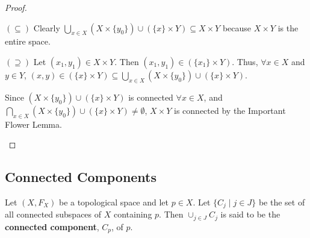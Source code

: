 \begin{proof}
\begin{itemize}
		$(\subseteq)$ Clearly $\displaystyle{\bigcup_{x \in X}(X\times \{y_0\}) \cup (\{x\} \times Y)} \subseteq X\times Y$ because $X\times Y$ is the entire space. 
		
		$(\supseteq)$ Let $(x_1, y_1) \in X\times Y$. Then $(x_1, y_1) \in (\{x_1\}\times Y)$. Thus, $\forall x\in X$ and $y\in Y$, $(x,y) \in (\{x\} \times Y) \subseteq {\displaystyle\bigcup_{x \in X}(X\times \{y_0\}) \cup (\{x\} \times Y)}$.
		
		Since $(X\times \{y_0\}) \cup (\{x\} \times Y)$ is connected $\forall x\in X$, and $\displaystyle{\bigcap_{x \in X}(X\times \{y_0\}) \cup (\{x\} \times Y)}\neq \emptyset$, $X\times Y$ is connected by the Important Flower Lemma. 
	\end{itemize}
\end{proof}

\subsection{Connected Components} 
\begin{definition}
	Let $(X, F_X)$ be a topological space and let $p\in X$. Let $\{C_j\mid j\in J\}$ be the set of all connected subspaces of $X$ containing $p$. Then ${\cup_{j\in J}C_j}$ is said to be the \textbf{connected component}, $C_p$, of $p$. 
\end{definition}

